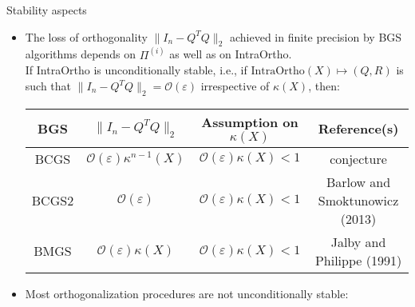 \documentclass[t,usepdftitle=false]{beamer}
\begin{document}
\begin{frame}{Stability aspects}
\begin{itemize}
\item The loss of orthogonality $\|I_n-Q^TQ\|_2$ achieved in finite precision by BGS algorithms depends on $\Pi^{(i)}$ as well as on IntraOrtho.\vspace{.1cm}\\
If IntraOrtho is unconditionally stable, i.e., if $\text{IntraOrtho}(X)\mapsto(Q,R)$ is such that
$\|I_n-Q^TQ\|_2=\mathcal{O}(\varepsilon)$ irrespective of $\kappa(X)$, then:\vspace{-.25cm}
\begin{center}{\small\hspace*{-.65cm}
\begin{tabular}{|c|c|c|c|}
\hline
BGS   & $\|I_n-Q^TQ\|_2$ & Assumption on $\kappa(X)$ & Reference(s)\\
\hline
BCGS  & $\mathcal{O}(\varepsilon)\kappa^{n-1}(X)$ & $\mathcal{O}(\varepsilon)\kappa(X)<1$ & conjecture\\ 
BCGS2 & $\mathcal{O}(\varepsilon)$ & $\mathcal{O}(\varepsilon)\kappa(X)<1$ & $\!\!$Barlow and Smoktunowicz (2013)$\!\!\!$\\ 
BMGS  & $\mathcal{O}(\varepsilon)\kappa(X)$ & $\mathcal{O}(\varepsilon)\kappa(X)<1$ & Jalby and Philippe (1991)\\ 
\hline
\end{tabular}}
\end{center}\vspace{.1cm}
\item Most orthogonalization procedures are not unconditionally stable:\vspace{-.3cm}
\begin{center}
\end{center}
\end{itemize}
\end{frame}
\end{document}
